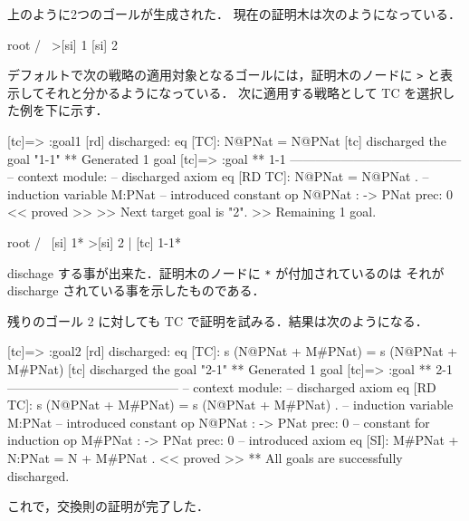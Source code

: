 \documentclass[a4paper,oneside,10pt,here]{memoir}
\newenvironment{vvtm}%
{\parskip=0pt\lineskip=0pt\begin{center}\begin{minipage}{0.8\textwidth}\begin{snugshade}}%
  {\end{snugshade}\end{minipage}\end{center}}
\begin{document}
上のように2つのゴールが生成された．
現在の証明木は次のようになっている．
\begin{vvtm}
  \begin{simplev}
     root      
   /        \   
>[si] 1  [si] 2
  \end{simplev}
\end{vvtm}

デフォルトで次の戦略の適用対象となるゴールには，証明木のノードに
\verb|>| と表示してそれと分かるようになっている．
次に適用する戦略として TC を選択した例を下に示す．

\begin{vvtm}
  \begin{simplev}
[tc]=> :goal{1}
[rd] discharged: 
  eq [TC]: N@PNat = N@PNat
[tc] discharged the goal "1-1"
** Generated 1 goal
[tc]=>
:goal { ** 1-1 -----------------------------------------
  -- context module: %
  -- discharged axiom
    eq [RD TC]: N@PNat = N@PNat .
  -- induction variable
    M:PNat
  -- introduced constant
    op N@PNat : -> PNat { prec: 0 }
} << proved >>
>> Next target goal is "2".
>> Remaining 1 goal.

       root       
    /         \    
 [si] 1*   >[si] 2
    |              
[tc] 1-1*        
  \end{simplev}
\end{vvtm}
dischage する事が出来た．証明木のノードに \verb|*| が付加されているのは
それが discharge されている事を示したものである．

残りのゴール 2 に対しても TC で証明を試みる．結果は次のようになる．
\begin{vvtm}
  \begin{simplev}
[tc]=> :goal{2}
[rd] discharged: 
  eq [TC]: s (N@PNat + M#PNat) = s (N@PNat + M#PNat)
[tc] discharged the goal "2-1"
** Generated 1 goal
[tc]=>
:goal { ** 2-1 -----------------------------------------
  -- context module: %
  -- discharged axiom
    eq [RD TC]: s (N@PNat + M#PNat) = s (N@PNat + M#PNat) .
  -- induction variable
    M:PNat
  -- introduced constant
    op N@PNat : -> PNat { prec: 0 }
  -- constant for induction
    op M#PNat : -> PNat { prec: 0 }
  -- introduced axiom
    eq [SI]: M#PNat + N:PNat = N + M#PNat .
} << proved >>
** All goals are successfully discharged.
  \end{simplev}
\end{vvtm}
これで，交換則の証明が完了した．
\end{document}
